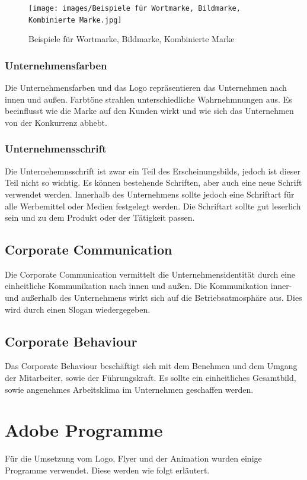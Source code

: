 \begin{figure}[H]
	\centering
	\texttt{[image: images/Beispiele für Wortmarke, Bildmarke, Kombinierte Marke.jpg]}
	\caption[Beispiele für Wortmarke, Bildmarke, Kombinierte Marke]{Beispiele für Wortmarke, Bildmarke, Kombinierte Marke}
	\label{fig:Beispiele für Wortmarke, Bildmarke, Kombinierte Marke}\parencite{Logodesign}
\end{figure}

\subsubsection{Unternehmensfarben}
Die Unternehmensfarben und das Logo repräsentieren das Unternehmen nach innen und außen. Farbtöne strahlen unterschiedliche Wahrnehmnungen aus. Es beeinflusst wie die Marke auf den Kunden wirkt und wie sich das Unternehmen von der Konkurrenz abhebt. \parencite{Unternehmensfarbe}

\subsubsection{Unternehmensschrift}
Die Unternehemnsschrift ist zwar ein Teil des Erscheinungsbilds, jedoch ist dieser Teil nicht so wichtig. Es können bestehende Schriften, aber auch eine neue Schrift verwendet werden. Innerhalb des Unternehmens sollte jedoch eine Schriftart für alle Werbemittel oder Medien festgelegt werden. Die Schriftart sollte gut leserlich sein und zu dem Produkt oder der Tätigkeit passen. \parencite{Unternehmensschrift}

\subsection{Corporate Communication}
Die Corporate Communication vermittelt die Unternehmensidentität durch eine einheitliche Kommunikation nach innen und außen. Die Kommunikation inner- und außerhalb des Unternehmens wirkt sich auf die Betriebsatmosphäre aus. Dies wird durch einen Slogan wiedergegeben.

\subsection{Corporate Behaviour}
Das Corporate Behaviour beschäftigt sich mit dem Benehmen und dem Umgang der Mitarbeiter, sowie der Führungskraft. Es sollte ein einheitliches Gesamtbild, sowie angenehmes Arbeitsklima im Unternehmen geschaffen werden. 

\section{Adobe Programme}
Für die Umsetzung vom Logo, Flyer und der Animation wurden einige Programme verwendet. Diese werden wie folgt erläutert.


